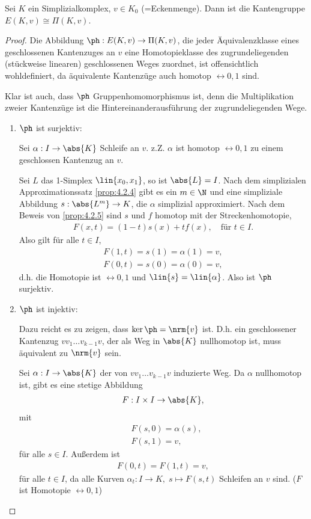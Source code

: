\begin{prop}
\label{prop:4.2.6}
Sei $K$ ein Simplizialkomplex, $v\in K_0$ (=Eckenmenge). Dann ist die Kantengruppe
$E(K,v)\cong \Pi(K,v)$.\fishhere
\end{prop}
\begin{proof}
Die Abbildung $\ph: E(K,v)\to \Pi(K,v)$, die jeder Äquivalenzklasse eines
geschlossenen Kantenzuges an $v$ eine Homotopieklasse des zugrundeliegenden
(stückweise linearen) geschlossenen Weges zuordnet, ist offensichtlich
wohldefiniert, da äquivalente Kantenzüge auch homotop $\rel{0,1}$ sind.

Klar ist auch, dass $\ph$ Gruppenhomomorphismus ist, denn die Multiplikation
zweier Kantenzüge ist die Hintereinanderausführung der zugrundeliegenden Wege.
\begin{enumerate}[label=\arabic{*}.)]
  \item $\ph$ ist surjektiv:

Sei $\alpha: I\to\abs{K}$ Schleife an $v$. z.Z. $\alpha$ ist homotop
$\rel{0,1}$ zu einem geschlossen Kantenzug an $v$.

Sei $L$ das 1-Simplex $\lin{x_0,x_1}$, so ist $\abs{L}=I$. Nach dem
simplizialen Approximationssatz \ref{prop:4.2.4} gibt es ein $m\in\N$ und eine
simpliziale Abbildung $s: \abs{L^m}\to K$, die $\alpha$ simplizial
approximiert. Nach dem Beweis von \ref{prop:4.2.5} sind $s$ und $f$ homotop
mit der Streckenhomotopie,
\begin{align*}
F(x,t) = (1-t)s(x) + tf(x),\quad \text{für } t\in I.
\end{align*}
Also gilt für alle $t\in I$,
\begin{align*}
F(1,t) = s(1) = \alpha(1) = v,\\
F(0,t) = s(0) = \alpha(0) = v,
\end{align*}
d.h. die Homotopie ist $\rel{0,1}$ und $\lin{s} = \lin{\alpha}$. Also ist $\ph$
surjektiv.
\item $\ph$ ist injektiv:

Dazu reicht es zu zeigen, dass $\ker \ph = \nrm{v}$ ist.
D.h. ein geschlossener Kantenzug $vv_1\ldots v_{k-1}v$, der als Weg in
$\abs{K}$ nullhomotop ist, muss äquivalent zu $\nrm{v}$ sein.

Sei $\alpha: I\to\abs{K}$ der von $vv_1\ldots v_{k-1}v$ induzierte Weg. Da
$\alpha$ nullhomotop ist, gibt es eine stetige Abbildung
\begin{align*}
F: I\times I\to \abs{K},
\end{align*}
mit
\begin{align*}
&F(s,0) = \alpha(s),\\
&F(s,1) = v,
\end{align*}
für alle $s\in I$. Außerdem ist
\begin{align*}
F(0,t) = F(1,t) = v,
\end{align*}
für alle $t\in I$, da alle Kurven $\alpha_t: I\to K,\; s\mapsto F(s,t)$
Schleifen an $v$ sind. ($F$ ist Homotopie $\rel{0,1}$)


\end{enumerate}
\end{proof}
